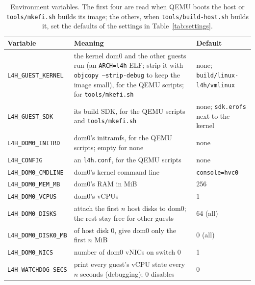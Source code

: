\documentclass[11pt,a4paper]{report}
\newcommand{\cmd}[1]{\texttt{#1}}
\newcommand{\file}[1]{\texttt{#1}}
\begin{document}
\begin{table}[ht]
\centering
\begin{tabularx}{\linewidth}{@{}lXl@{}}
\toprule
Variable & Meaning & Default \\
\midrule
\texttt{L4H\_GUEST\_KERNEL} & the kernel dom0 and the other guests run (an
  \texttt{ARCH=l4h} ELF; strip it with \cmd{objcopy --strip-debug} to keep
  the image small), for the QEMU scripts; for \cmd{tools/mkefi.sh} &
  none; \file{build/linux-l4h/vmlinux} \\
\texttt{L4H\_GUEST\_SDK} & its build SDK, for the QEMU scripts and
  \cmd{tools/mkefi.sh} & none; \file{sdk.erofs} next to the kernel \\
\texttt{L4H\_DOM0\_INITRD} & dom0's initramfs, for the QEMU scripts; empty
  for none & none \\
\texttt{L4H\_CONFIG} & an \file{l4h.conf}, for the QEMU scripts & none \\
\texttt{L4H\_DOM0\_CMDLINE} & dom0's kernel command line & \texttt{console=hvc0} \\
\texttt{L4H\_DOM0\_MEM\_MB} & dom0's RAM in MiB & 256 \\
\texttt{L4H\_DOM0\_VCPUS} & dom0's vCPUs & 1 \\
\texttt{L4H\_DOM0\_DISKS} & attach the first $n$ host disks to dom0; the rest stay
  free for other guests & 64 (all) \\
\texttt{L4H\_DOM0\_DISK0\_MB} & of host disk 0, give dom0 only the first $n$ MiB &
  0 (all) \\
\texttt{L4H\_DOM0\_NICS} & number of dom0 vNICs on switch 0 & 1 \\
\texttt{L4H\_WATCHDOG\_SECS} & print every guest's vCPU state every $n$ seconds
  (debugging); 0 disables & 0 \\
\bottomrule
\end{tabularx}
\caption{Environment variables. The first four are read when QEMU
  boots the host or \cmd{tools/mkefi.sh} builds its image; the others, when \cmd{tools/build-host.sh} builds it, set
  the defaults of the settings in Table~\ref{tab:settings}.}
\label{tab:env}
\end{table}
\end{document}
